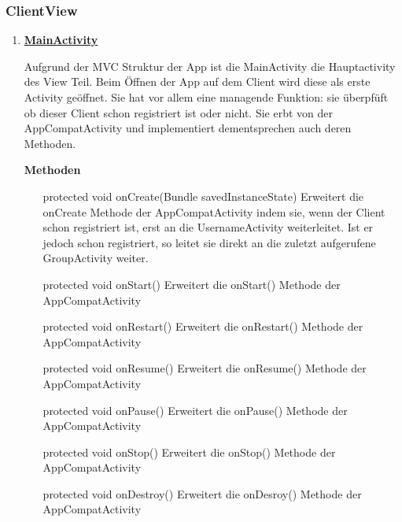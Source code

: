 \subsubsection{ClientView}
\begin{enumerate}
	\item \textbf{\underline{MainActivity}}
	
	Aufgrund der MVC Struktur der App ist die MainActivity die Hauptactivity des View Teil. Beim Öffnen der App auf dem Client wird diese als erste Activity geöffnet. Sie hat vor allem eine managende Funktion: sie überpfüft ob dieser Client schon registriert ist oder nicht. Sie erbt von der AppCompatActivity und implementiert dementsprechen auch deren Methoden.
	
	\textbf{Methoden}
	\begin{enumerate}
		\item[protected void onCreate(Bundle savedInstanceState)] 
		Erweitert die onCreate Methode der AppCompatActivity indem sie, wenn der Client schon registriert ist, erst an die UsernameActivity weiterleitet. Ist er jedoch schon registriert, so leitet sie direkt an die zuletzt aufgerufene GroupActivity weiter.
		\item[protected void onStart()]
		Erweitert die onStart() Methode der AppCompatActivity %
		\item[protected void onRestart()]
		Erweitert die onRestart() Methode der AppCompatActivity %
		\item[protected void onResume()]
		Erweitert die onResume() Methode der AppCompatActivity %
		\item[protected void onPause()]
		Erweitert die onPause() Methode der AppCompatActivity %
		\item[protected void onStop()]
		Erweitert die onStop() Methode der AppCompatActivity %
		\item[protected void onDestroy()]
		Erweitert die onDesroy() Methode der AppCompatActivity %
	\end{enumerate}
	

\end{enumerate}

